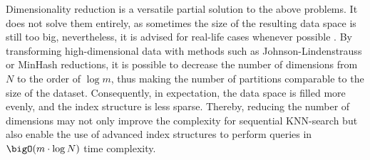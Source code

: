 Dimensionality reduction is a versatile partial solution to the above problems. It does not solve them entirely, as sometimes the size of the resulting data space is still too big, nevertheless, it is advised for real-life cases whenever possible \cite{berchtold2002xtree}. By transforming high-dimensional data with methods such as Johnson-Lindenstrauss or MinHash reductions, it is possible to decrease the number of dimensions from \( N \) to the order of \( \log m \), thus making the number of partitions comparable to the size of the dataset. Consequently, in expectation, the data space is filled more evenly, and the index structure is less sparse. Thereby, reducing the number of dimensions may not only improve the complexity for sequential KNN-search but also enable the use of advanced index structures to perform queries in \( \bigO(m \cdot \log N) \) time complexity.